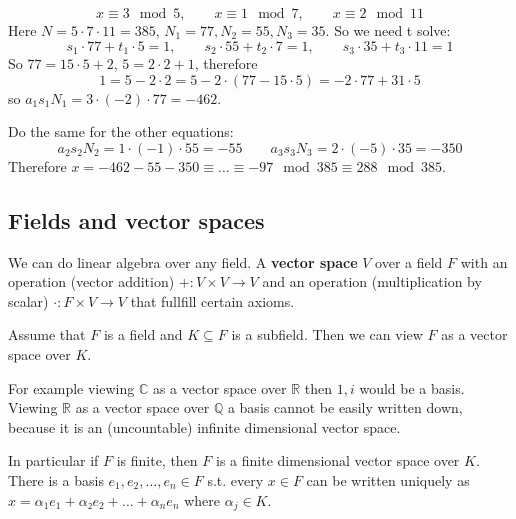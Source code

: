 \documentclass[english]{lbscript}
\begin{document}
\begin{example}{}{}
	\begin{equation}
		\label{eq:119}
		x≡3 \mod 5, \quad\quad  x≡1 \mod 7, \quad\quad x≡2 \mod 11
	\end{equation}
	Here \(N=5⋅7⋅11=385\), \(N_1=77, N_2=55, N_3=35\). So we need t solve:
	\begin{equation}
		\label{eq:125}
		s_1⋅77+t_1⋅5=1,\quad\quad s_2⋅55+t_2⋅7=1, \qquad s_3⋅35+t_3⋅11=1
	\end{equation}
	So \(77=15⋅5+2\), \(5=2⋅2+1\), therefore
	\begin{equation}
		\label{eq:126}
		1= 5 - 2⋅2= 5-2⋅(77-15⋅5)= - 2⋅77+31⋅5
	\end{equation}
	so \(a_1s_1N_1=3⋅(-2)⋅77=-462\).

	Do the same for the other equations:
	\begin{equation*}
		a_2s_2N_2=1⋅(-1)⋅55=-55 \quad \quad a_3s_3N_3 = 2⋅(-5)⋅35 = -350
	\end{equation*}
	Therefore \(x=-462-55-350 ≡ \dots ≡ -97 \mod 385 ≡ 288 \mod 385\).
\end{example}


\subsection{Fields and vector spaces}
\label{sec:fields-vector-spaces}

We can do linear algebra over any field. A \textbf{vector space} \(V\) over a field \(F\) with an operation (vector addition) \(+:V×V→V\) and an operation (multiplication by scalar) \(⋅:F×V→V\) that fullfill certain axioms.

\begin{example}{}{}
	Assume that \(F\) is a field and \(K⊆F\) is a subfield. Then we can view \(F\) as a vector space over \(K\).
\end{example}
\begin{example}{}{}
	For example viewing \(ℂ\) as a vector space over \(ℝ\) then \(1, i\) would be a basis. Viewing \(ℝ\) as a vector space over \(ℚ\) a basis cannot be easily written down, because it is an (uncountable) infinite dimensional vector space.
\end{example}

In particular if \(F\) is finite, then \(F\) is a finite dimensional vector space over \(K\). There is a basis \(e_1,e_2,\dots, e_n∈F\) s.t. every \(x∈F\) can be written uniquely as \(x=𝛼_{1}e_1+𝛼₂e_2+\dots+𝛼_{n}e_n\) where \(𝛼_{j}∈K\).
\end{document}
